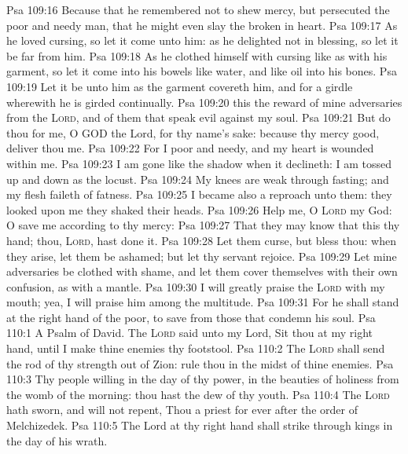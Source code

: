 \vs Psa 109:16 Because that he remembered not to shew mercy, but persecuted the poor and needy man, that he might even slay the broken in heart.
\vs Psa 109:17 As he loved cursing, so let it come unto him: as he delighted not in blessing, so let it be far from him.
\vs Psa 109:18 As he clothed himself with cursing like as with his garment, so let it come into his bowels like water, and like oil into his bones.
\vs Psa 109:19 Let it be unto him as the garment  covereth him, and for a girdle wherewith he is girded continually.
\vs Psa 109:20  this  the reward of mine adversaries from the \textsc{Lord}, and of them that speak evil against my soul.
\vs Psa 109:21 But do thou for me, O GOD the Lord, for thy name's sake: because thy mercy  good, deliver thou me.
\vs Psa 109:22 For I  poor and needy, and my heart is wounded within me.
\vs Psa 109:23 I am gone like the shadow when it declineth: I am tossed up and down as the locust.
\vs Psa 109:24 My knees are weak through fasting; and my flesh faileth of fatness.
\vs Psa 109:25 I became also a reproach unto them:  they looked upon me they shaked their heads.
\vs Psa 109:26 Help me, O \textsc{Lord} my God: O save me according to thy mercy:
\vs Psa 109:27 That they may know that this  thy hand;  thou, \textsc{Lord}, hast done it.
\vs Psa 109:28 Let them curse, but bless thou: when they arise, let them be ashamed; but let thy servant rejoice.
\vs Psa 109:29 Let mine adversaries be clothed with shame, and let them cover themselves with their own confusion, as with a mantle.
\vs Psa 109:30 I will greatly praise the \textsc{Lord} with my mouth; yea, I will praise him among the multitude.
\vs Psa 109:31 For he shall stand at the right hand of the poor, to save  from those that condemn his soul.
\vs Psa 110:1 A Psalm of David. The \textsc{Lord} said unto my Lord, Sit thou at my right hand, until I make thine enemies thy footstool.
\vs Psa 110:2 The \textsc{Lord} shall send the rod of thy strength out of Zion: rule thou in the midst of thine enemies.
\vs Psa 110:3 Thy people  willing in the day of thy power, in the beauties of holiness from the womb of the morning: thou hast the dew of thy youth.
\vs Psa 110:4 The \textsc{Lord} hath sworn, and will not repent, Thou  a priest for ever after the order of Melchizedek.
\vs Psa 110:5 The Lord at thy right hand shall strike through kings in the day of his wrath.
